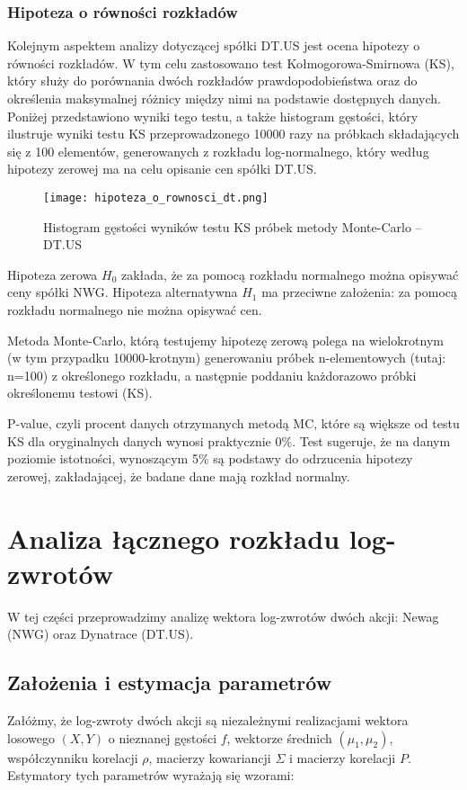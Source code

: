 \documentclass[a4paper,11pt]{article}
\begin{document}
\subsubsection{Hipoteza o równości rozkładów}
Kolejnym aspektem analizy dotyczącej spółki DT.US jest ocena hipotezy o równości rozkładów. W tym celu zastosowano test Kołmogorowa-Smirnowa (KS), który służy do porównania dwóch rozkładów prawdopodobieństwa oraz do określenia maksymalnej różnicy między nimi na podstawie dostępnych danych. Poniżej przedstawiono wyniki tego testu, a także histogram gęstości, który ilustruje wyniki testu KS przeprowadzonego 10000 razy na próbkach składających się z 100 elementów, generowanych z rozkładu log-normalnego, który według hipotezy zerowej ma na celu opisanie cen spółki DT.US.
\begin{figure}[h]
\centering
\texttt{[image: hipoteza\_o\_rownosci\_dt.png]}
\caption{Histogram gęstości wyników testu KS próbek metody Monte-Carlo -- DT.US}
\end{figure}

Hipoteza zerowa \(H_0\) zakłada, że za pomocą rozkładu normalnego można opisywać ceny spółki NWG. Hipoteza alternatywna \(H_1\) ma przeciwne założenia: za pomocą rozkładu normalnego nie można opisywać cen.

Metoda Monte-Carlo, którą testujemy hipotezę zerową polega na wielokrotnym (w tym przypadku 10000-krotnym) generowaniu próbek n-elementowych (tutaj: n=100) z określonego rozkładu, a następnie poddaniu każdorazowo próbki określonemu testowi (KS). 

P-value, czyli procent danych otrzymanych metodą MC, które są większe od testu KS dla oryginalnych danych wynosi praktycznie 0\%. Test sugeruje, że na danym poziomie istotności, wynoszącym 5\% są podstawy do odrzucenia hipotezy zerowej, zakładającej, że badane dane mają rozkład normalny.



\section{Analiza łącznego rozkładu log-zwrotów}

W tej części przeprowadzimy analizę wektora log-zwrotów dwóch akcji: Newag (NWG) oraz Dynatrace (DT.US). 

\subsection{Założenia i estymacja parametrów}
Załóżmy, że log-zwroty dwóch akcji są niezależnymi realizacjami wektora losowego \((X, Y)\) o nieznanej gęstości \(f\), wektorze średnich \((\mu_1, \mu_2)\), współczynniku korelacji \(\rho\), macierzy kowariancji \(\Sigma\) i macierzy korelacji \(P\). Estymatory tych parametrów wyrażają się wzorami:
\end{document}
